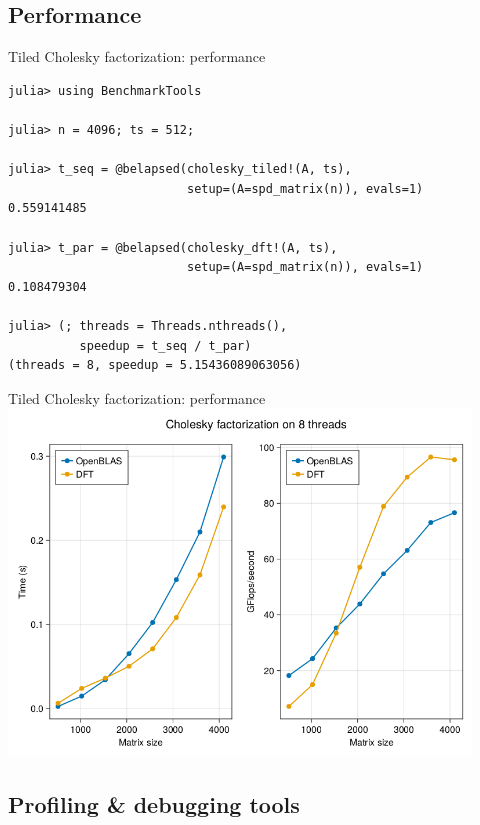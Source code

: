 \documentclass{beamer}
\begin{document}
\subsection{Performance}
\begin{frame}[fragile]{Tiled Cholesky factorization: performance}
\begin{verbatim}
julia> using BenchmarkTools

julia> n = 4096; ts = 512;

julia> t_seq = @belapsed(cholesky_tiled!(A, ts),
                         setup=(A=spd_matrix(n)), evals=1)
0.559141485

julia> t_par = @belapsed(cholesky_dft!(A, ts),
                         setup=(A=spd_matrix(n)), evals=1)
0.108479304

julia> (; threads = Threads.nthreads(),
          speedup = t_seq / t_par)
(threads = 8, speedup = 5.15436089063056)
\end{verbatim}
\end{frame}



\begin{frame}{Tiled Cholesky factorization: performance}
\centering\includegraphics[width=0.92\textwidth]{Cholesky_perf.png}
\end{frame}

\subsection{Profiling \& debugging tools}
\end{document}
